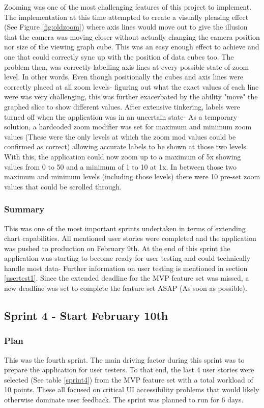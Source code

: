 Zooming was one of the most challenging features of this project to implement. The implementation at this time attempted to create a visually pleasing effect (See Figure \ref{fig:oldzoom}) where axis lines would move out to give the illusion that the camera was moving closer without actually changing the camera position nor size of the viewing graph cube. This was an easy enough effect to achieve and one that could correctly sync up with the position of data cubes too.
The problem then, was correctly labelling axis lines at every possible state of zoom level. In other words, Even though positionally the cubes and axis lines were correctly placed at all zoom levels- figuring out what the exact values of each line were was very challenging, this was further exacerbated by the ability "move" the graphed slice to show different values. After extensive tinkering, labels were turned off when the application was in an uncertain state- As a temporary solution, a hardcoded zoom modifier was set for maximum and minimum zoom values (These were the only levels at which the zoom mod values could be confirmed as correct) allowing accurate labels to be shown at those two levels.
With this, the application could now zoom up to a maximum of 5x showing values from 0 to 50 and a minimum of 1 to 10 at 1x. In between those two maximum and minimum levels (including those levels) there were 10 pre-set zoom values that could be scrolled through.

\subsubsection{Summary}
This was one of the most important sprints undertaken in terms of extending chart capabilities. All mentioned user stories were completed and the application was pushed to production on February 9th. At the end of this sprint the application was starting to become ready for user testing and could technically handle most data- Further information on user testing is mentioned in section \ref{usertest1}. Since the extended deadline for the MVP feature set was missed, a new deadline was set to complete the feature set ASAP (As soon as possible).

\subsection{Sprint 4 - Start February 10th}
\subsubsection{Plan}
This was the fourth sprint. The main driving factor during this sprint was to prepare the application for user testers. To that end, the last 4 user stories were selected (See table \ref{sprint4}) from the MVP feature set with a total workload of 10 points. These all focused on critical UI accessibility problems that would likely otherwise dominate user feedback. The sprint was planned to run for 6 days.

